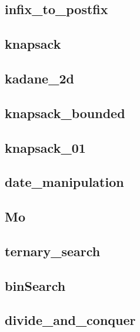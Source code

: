 \subsection{infix_to_postfix}
\raggedbottom
\hrulefill
\subsection{knapsack}
\raggedbottom
\hrulefill
\subsection{kadane_2d}
\raggedbottom
\hrulefill
\subsection{knapsack_bounded}
\raggedbottom
\hrulefill
\subsection{knapsack_01}
\raggedbottom
\hrulefill
\subsection{date_manipulation}
\raggedbottom
\hrulefill
\subsection{Mo}
\raggedbottom
\hrulefill
\subsection{ternary_search}
\raggedbottom
\hrulefill
\subsection{binSearch}
\raggedbottom
\hrulefill
\subsection{divide_and_conquer}
\raggedbottom
\hrulefill
